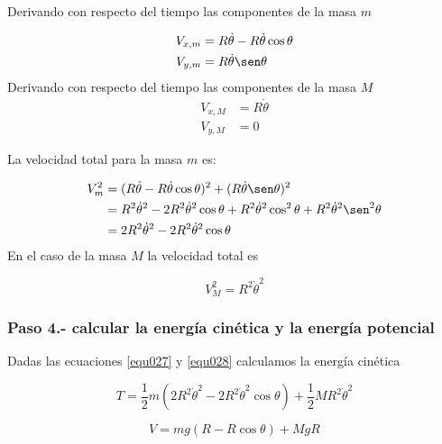 \documentclass[12pt]{book}
\theoremstyle{definition}
\theoremstyle{remark}
\theoremstyle{plain}
\begin{document}
Derivando con respecto del tiempo las componentes de la masa $m$

\begin{equation}
\label{equ025}
\begin{aligned}
V_{x,m} & =R \dot{\theta} - R \dot{\theta} \cos \theta \\
V_{y,m} & = R \dot{\theta} \sen \theta
\end{aligned}
\end{equation}
Derivando con respecto del tiempo las componentes de la masa $M$
\begin{equation}
\label{equ026}
\begin{aligned}
V_{x,M} & =R \dot{\theta} \\
V_{y,M} & = 0
\end{aligned}
\end{equation}

La velocidad total para la masa $m$ es:

\begin{equation}
\label{equ027}
\begin{aligned}
V_{m} ^2 &  = (R \dot{\theta} - R \dot{\theta} \cos \theta)^2+(R \dot{\theta} \sen \theta)^2 \\
 & = R^2 \dot{\theta}^2- 2 R^2 \dot{\theta}^2 \cos \theta + R^2 \dot{\theta}^2 \cos ^2 \theta + R^2 \dot{\theta}^2  \sen ^2 \theta \\
&  =2  R^2 \dot{\theta}^2- 2 R^2 \dot{\theta}^2 \cos \theta 
\end{aligned}
\end{equation}
En el caso de la masa $M$ la velocidad total es

\begin{equation}
\label{equ028}
V_M ^2=R ^2 \dot{\theta}^2 
\end{equation}

\subsubsection{Paso 4.- calcular la energía cinética y la energía potencial}
Dadas las ecuaciones \ref{equ027} y \ref{equ028} calculamos la energía cinética

\begin{equation}
\label{equ029}
T = \frac{1}{2} m (2  R^2 \dot{\theta}^2- 2 R^2 \dot{\theta}^2 \cos \theta )+\frac{1}{2} M R ^2 \dot{\theta}^2 
\end{equation}

\begin{equation}
\label{equ030}
V = m g (R- R \cos \theta)+ M g R
\end{equation}
\end{document}
